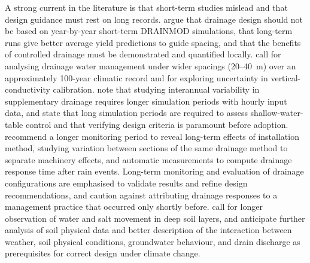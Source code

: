 A strong current in the literature is that short-term studies mislead and that
design guidance must rest on long records. \textcite{Wang2006b} argue that
drainage design should not be based on year-by-year short-term DRAINMOD
simulations, that long-term runs give better average yield predictions to
guide spacing, and that the benefits of controlled drainage must be
demonstrated and quantified locally. \textcite{Ale2009} call for analysing
drainage water management under wider spacings (20--40~m) over an approximately
100-year climatic record and for exploring uncertainty in vertical-conductivity
calibration. \textcite{Häggblom2019} note that studying interannual
variability in supplementary drainage requires longer simulation periods with
hourly input data, and \textcite{Malota2015} state that long simulation
periods are required to assess shallow-water-table control and that verifying
design criteria is paramount before adoption. \textcite{Salo2019} recommend a
longer monitoring period to reveal long-term effects of installation method,
studying variation between sections of the same drainage method to separate
machinery effects, and automatic measurements to compute drainage response time
after rain events. Long-term monitoring and
evaluation of drainage configurations are emphasised to validate results and
refine design recommendations, and \textcite{Kladivko2023} caution against attributing
drainage responses to a management practice that occurred only shortly before.
\textcite{Chang2012} call for longer observation of water and salt movement in
deep soil layers, and \textcite{Deelstra2015} anticipate further analysis of
soil physical data and better description of the interaction between weather,
soil physical conditions, groundwater behaviour, and drain discharge as
prerequisites for correct design under climate change.

